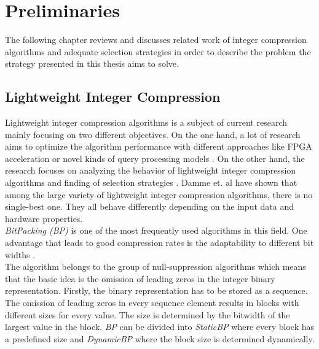 \chapter{Preliminaries}
The following chapter reviews and discusses related work of integer compression algorithms and adequate selection strategies in order to describe the problem the strategy presented in this thesis aims to solve. 

\section{Lightweight Integer Compression}
Lightweight integer compression algorithms is a subject of current research mainly focusing on two different objectives. On the one hand, a lot of research aims to optimize the algorithm performance with different approaches like FPGA acceleration \cite{Mohsen2020, JahanLisa2019} or novel kinds of query processing models \cite{Damme2020}. On the other hand, the research focuses on analyzing the behavior of lightweight integer compression algorithms and finding of selection strategies \cite{Abadi2006, Damme2019, Woltmann2021}.
Damme et. al \cite{Damme2017, Damme2019} have shown that among the large variety of lightweight integer compression algorithms, there is no single-best one. They all behave differently depending on the input data and hardware properties.\\
\emph{BitPacking (BP)} is one of the most frequently used algorithms in this field. One advantage that leads to good compression rates is the adaptability to different bit widths \cite{Damme2019}.\\ 
The algorithm belongs to the group of null-suppression algorithms which means that the basic idea is the omission of leading zeros in the integer binary representation. Firstly, the binary representation has to be stored as a sequence. The omission of leading zeros in every sequence element results in blocks with different sizes for every value. The size is determined by the bitwidth of the largest value in the block. 
\emph{BP} can be divided into \emph{StaticBP} where every block has a predefined size and \emph{DynamicBP} where the block size is determined dynamically.\\
